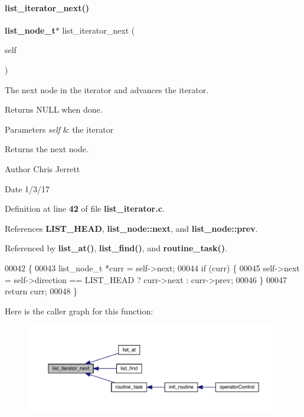 \paragraph{list\+\_\+iterator\+\_\+next()}
{\footnotesize\ttfamily \textbf{ list\+\_\+node\+\_\+t}$\ast$ list\+\_\+iterator\+\_\+next (\begin{DoxyParamCaption}\item[{\textbf{ list\+\_\+iterator\+\_\+t} $\ast$}]{self }\end{DoxyParamCaption})}



The next node in the iterator and advances the iterator. 

Returns N\+U\+LL when done. 
\begin{DoxyParams}{Parameters}
{\em self} & the iterator \\
\hline
\end{DoxyParams}
\begin{DoxyReturn}{Returns}
the next node. 
\end{DoxyReturn}
\begin{DoxyAuthor}{Author}
Chris Jerrett 
\end{DoxyAuthor}
\begin{DoxyDate}{Date}
1/3/17 
\end{DoxyDate}


Definition at line \textbf{ 42} of file \textbf{ list\+\_\+iterator.\+c}.



References \textbf{ L\+I\+S\+T\+\_\+\+H\+E\+AD}, \textbf{ list\+\_\+node\+::next}, and \textbf{ list\+\_\+node\+::prev}.



Referenced by \textbf{ list\+\_\+at()}, \textbf{ list\+\_\+find()}, and \textbf{ routine\+\_\+task()}.


\begin{DoxyCode}
00042                                                        \{
00043   list_node_t *curr = \textcolor{keyword}{self}->next;
00044   \textcolor{keywordflow}{if} (curr) \{
00045     \textcolor{keyword}{self}->next = \textcolor{keyword}{self}->direction == LIST_HEAD ? curr->next : curr->prev;
00046   \}
00047   \textcolor{keywordflow}{return} curr;
00048 \}
\end{DoxyCode}
Here is the caller graph for this function\+:\nopagebreak
\begin{figure}[H]
\begin{center}
\leavevmode
\includegraphics[width=350pt]{list__iterator_8c_a2e5db981e32d3aef49ea79505a0615a6_icgraph}
\end{center}
\end{figure}
